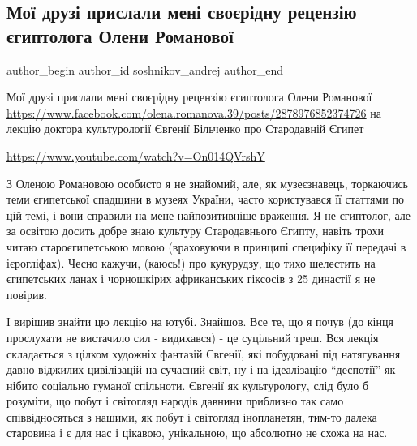  
 
 
 
 
 
\subsection{Мої друзі прислали мені своєрідну рецензію єгиптолога Олени Романової}
\label{sec:28_01_2021.fb.soshnikov_andrej.1.recenzia_romanova_bilchenko_egiptologia}
\ifcmt
 author_begin
   author_id soshnikov_andrej
 author_end
\fi

Мої друзі прислали мені своєрідну рецензію єгиптолога Олени Романової
\url{https://www.facebook.com/olena.romanova.39/posts/2878976852374726} на
лекцію доктора культурології Євгенії Більченко про Стародавній Єгипет 

\url{https://www.youtube.com/watch?v=On014QVrshY}

З Оленою Романовою особисто я не знайомий, але, як музеєзнавець, торкаючись
теми єгипетської спадщини в музеях України, часто користувався її статтями по
цій темі, і вони справили на мене найпозитивніше враження. Я не єгиптолог, але
за освітою досить добре знаю культуру Стародавнього Єгипту, навіть трохи читаю
староєгипетською мовою  (враховуючи в принципі специфіку її передачі в
ієрогліфах). Чесно кажучи, (каюсь!) про кукурудзу, що тихо шелестить  на
єгипетських ланах і чорношкірих африканських гіксосів з 25 династії я не
повірив. 

І вирішив знайти цю лекцію на ютубі. Знайшов. Все те, що я почув (до кінця
прослухати не вистачило сил - видихався) - це суцільний треш. Вся лекція
складається з цілком художніх фантазій Євгенії, які побудовані під натягування
давно віджилих цивілізацій на сучасний світ, ну і на ідеалізацію
\enquote{деспотії} як нібито соціально гуманої спільноти. Євгенії як
культурологу, слід було б розуміти, що побут і світогляд народів давнини
приблизно так само співвідносяться з нашими, як побут і світогляд інопланетян,
тим-то далека старовина і є для нас і цікавою, унікальною, що абсолютно не
схожа на нас. 

